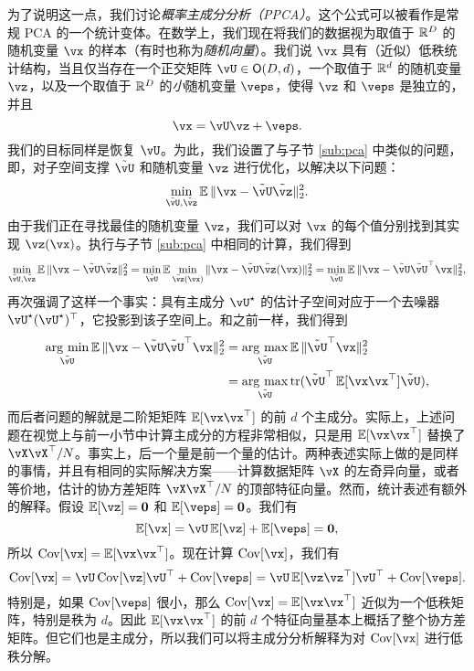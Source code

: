 \documentclass[../../book-main_zh.tex]{subfiles}
\begin{document}
为了说明这一点，我们讨论\textit{概率主成分分析（PPCA）}。这个公式可以被看作是常规 PCA 的一个统计变体。在数学上，我们现在将我们的数据视为取值于 \(\mathbb{R}^{D}\) 的随机变量 \(\vx\) 的样本（有时也称为\textit{随机向量}）。我们说 \(\vx\) 具有（近似）低秩统计结构，当且仅当存在一个正交矩阵 \(\vU \in \O(D, d)\)，一个取值于 \(\mathbb{R}^{d}\) 的随机变量 \(\vz\)，以及一个取值于 \(\mathbb{R}^{D}\) 的\textit{小}随机变量 \(\veps\)，使得 \(\vz\) 和 \(\veps\) 是独立的，并且
\begin{equation}
    \vx = \vU\vz + \veps.
\end{equation}
我们的目标同样是恢复 \(\vU\)。为此，我们设置了与子节 \eqref{sub:pca} 中类似的问题，即，对子空间支撑 \(\tilde{\vU}\) 和随机变量 \(\vz\) 进行优化，以解决以下问题：
\begin{equation}
    \min_{\tilde{\vU}, \tilde{\vz}}\Ex\norm{\vx - \tilde{\vU}\tilde{\vz}}_{2}^{2}.
\end{equation}
由于我们正在寻找最佳的随机变量 \(\vz\)，我们可以对 \(\vx\) 的每个值分别找到其实现 \(\vz(\vx)\)。执行与子节 \eqref{sub:pca} 中相同的计算，我们得到 %
\begin{equation}\label{eq:ppca_denoising}
    \min_{\tilde{\vU}, \tilde{\vz}}\Ex\norm{\vx - \tilde{\vU}\tilde{\vz}}_{2}^{2} = \min_{\tilde{\vU}}\Ex\min_{\tilde{\vz}(\vx)}\norm{\vx - \tilde{\vU}\tilde{\vz}(\vx)}_{2}^{2} = \min_{\tilde{\vU}}\Ex\norm{\vx - \tilde{\vU}\tilde{\vU}^{\top}\vx}_{2}^{2},
\end{equation}
再次强调了这样一个事实：具有主成分 \(\vU^{\star}\) 的估计子空间对应于一个去噪器 \(\vU^{\star}(\vU^{\star})^{\top}\)，它投影到该子空间上。和之前一样，我们得到
\begin{align}\label{eq:PPCA}
    \argmin_{\tilde{\vU}}\Ex\norm{\vx - \tilde{\vU}\tilde{\vU}^{\top}\vx}_{2}^{2} 
    &= \argmax_{\tilde{\vU}}\Ex\norm{\tilde{\vU}^{\top}\vx}_{2}^{2} \\
    &= \argmax_{\tilde{\vU}}\tr(\tilde{\vU}^{\top}\Ex[\vx\vx^{\top}]\tilde{\vU}),
\end{align}
而后者问题的解就是二阶矩矩阵 \(\Ex[\vx\vx^{\top}]\) 的前 \(d\) 个主成分。实际上，上述问题在视觉上与前一小节中计算主成分的方程非常相似，只是用 \(\Ex[\vx\vx^{\top}]\) 替换了 \(\vX\vX^{\top}/N\)。事实上，后一个量是前一个量的估计。两种表述实际上做的是同样的事情，并且有相同的实际解决方案——计算数据矩阵 \(\vX\) 的左奇异向量，或者等价地，估计的协方差矩阵 \(\vX\vX^{\top}/N\) 的顶部特征向量。然而，统计表述有额外的解释。假设 \(\Ex[\vz] = \vzero\) 和 \(\Ex[\veps] = \vzero\)。我们有
\begin{equation}
    \Ex[\vx] = \vU\Ex[\vz] + \Ex[\veps] = \vzero,
\end{equation}
所以 \(\Cov[\vx] = \Ex[\vx\vx^{\top}]\)。现在计算 \(\Cov[\vx]\)，我们有
\begin{equation}
    \Cov[\vx] = \vU\Cov[\vz]\vU^{\top} + \Cov[\veps] = \vU\Ex[\vz\vz^{\top}]\vU^{\top} + \Cov[\veps].
\end{equation}
特别是，如果 \(\Cov[\veps]\) 很小，那么 \(\Cov[\vx] = \Ex[\vx\vx^{\top}]\) 近似为一个低秩矩阵，特别是秩为 \(d\)。因此 \(\Ex[\vx\vx^{\top}]\) 的前 \(d\) 个特征向量基本上概括了整个协方差矩阵。但它们也是主成分，所以我们可以将主成分分析解释为对 \(\Cov[\vx]\) 进行低秩分解。
\end{document}
